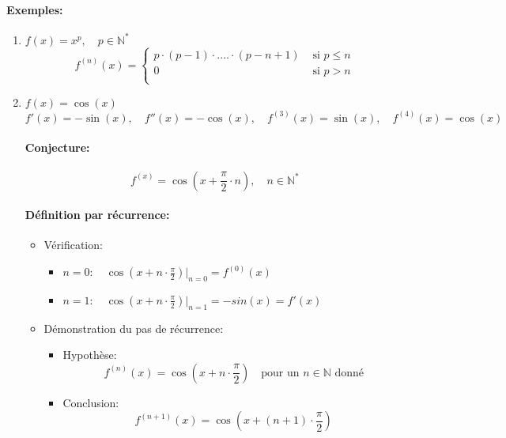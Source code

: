 \documentclass[
    11pt,
    a4paper,
    oneside,
    headinlcude, footinclude,
    twoside,
]{report}
\begin{document}
\paragraph{Exemples:}

\begin{enumerate}
    \item $f(x) = x^{p}, \quad p \in \mathbb{N}^{*}$
        $$
        f^{(n)} (x) =
        \left\{
            \begin{array}{ll}
                p\cdot (p-1) \cdot .... \cdot (p - n+ 1) & \text{ si }  p \leq n\\
                0 & \text{ si } p > n\\
            \end{array}
        \right.
        $$

    \item $f(x) = \cos(x)$
        $$f'(x) = - \sin(x), \quad f''(x) = - \cos(x), \quad f^{(3)}(x) = \sin(x),
        \quad f^{(4)}(x) = \cos(x)$$
        \paragraph{Conjecture:} $$f^{(x)} = \cos\left(x + \frac{\pi}{2} \cdot n\right), \quad n \in
        \mathbb{N}^{*}$$

        \paragraph{Définition par récurrence:}
        \begin{itemize}
            \item Vérification:
                \begin{itemize}
                    \item $n = 0: \quad \cos\left(x + n\cdot \frac{\pi}{2}\right)\Bigr|_{n = 0} = f^{(0)}(x)$
                    \item $n = 1: \quad \cos\left(x + n\cdot \frac{\pi}{2}\right)\Bigr|_{n = 1} = - sin(x)= f'(x)$
                \end{itemize}

            \item Démonstration du pas de récurrence:
                \begin{itemize}
                    \item Hypothèse: $$f^{(n)} (x) = \cos\left(x + n \cdot \frac{\pi}{2}\right) \quad \text{pour un $n \in \mathbb{N}$ donné}$$
                    \item Conclusion:$$f^{(n+1)} (x) = \cos\left(x + (n+1) \cdot \frac{\pi}{2}\right)$$


\end{itemize}
\end{itemize}
\end{enumerate}
\end{document}
